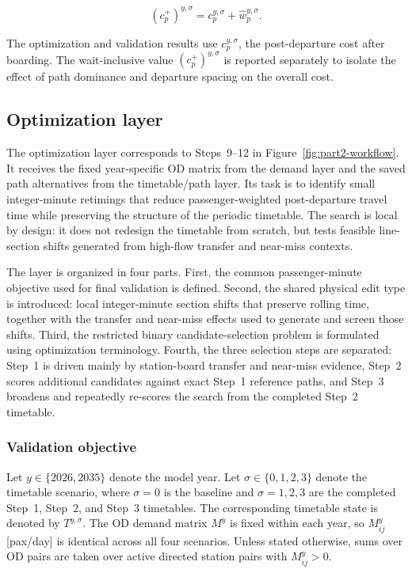 \documentclass[preprint,12pt]{elsarticle}
\begin{document}
\begin{equation}
(c_p^+)^{y,\sigma}
=
c_p^{y,\sigma}
+
\widehat w_p^{y,\sigma}.
\label{eq:part2-wait-inclusive-path-cost}
\end{equation}

The optimization and validation results use \(c_p^{y,\sigma}\), the post-departure cost after boarding. The wait-inclusive value \((c_p^+)^{y,\sigma}\) is reported separately to isolate the effect of path dominance and departure spacing on the overall cost.

\subsection{Optimization layer}\label{sec:methods-part2-optimization}
The optimization layer corresponds to Steps~9--12 in Figure~\ref{fig:part2-workflow}. It receives the fixed year-specific OD matrix from the demand layer and the saved path alternatives from the timetable/path layer. Its task is to identify small integer-minute retimings that reduce passenger-weighted post-departure travel time while preserving the structure of the periodic timetable. The search is local by design: it does not redesign the timetable from scratch, but tests feasible line-section shifts generated from high-flow transfer and near-miss contexts.

The layer is organized in four parts. First, the common passenger-minute objective used for final validation is defined. Second, the shared physical edit type is introduced: local integer-minute section shifts that preserve rolling time, together with the transfer and near-miss effects used to generate and screen those shifts. Third, the restricted binary candidate-selection problem is formulated using optimization terminology. Fourth, the three selection steps are separated: Step~1 is driven mainly by station-board transfer and near-miss evidence, Step~2 scores additional candidates against exact Step~1 reference paths, and Step~3 broadens and repeatedly re-scores the search from the completed Step~2 timetable.

\subsubsection{Validation objective}\label{sec:methods-part2-optimization-objective}
Let \(y\in\{2026,2035\}\) denote the model year. Let \(\sigma\in\{0,1,2,3\}\) denote the timetable scenario, where \(\sigma=0\) is the baseline and \(\sigma=1,2,3\) are the completed Step~1, Step~2, and Step~3 timetables. The corresponding timetable state is denoted by \(T^{y,\sigma}\). The OD demand matrix \(M^y\) is fixed within each year, so \(M^y_{ij}\) [pax/day] is identical across all four scenarios. Unless stated otherwise, sums over OD pairs are taken over active directed station pairs with \(M^y_{ij}>0\).
\end{document}
